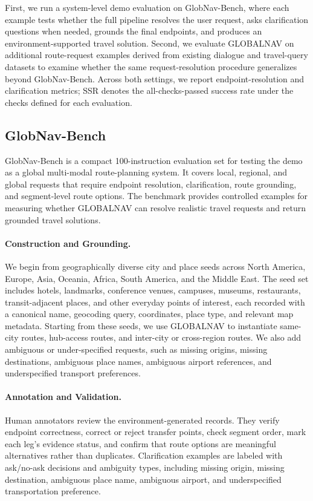 \documentclass[11pt]{article}
\newcommand{\sys}{GLOBALNAV\xspace}
\newcommand{\bench}{GlobNav-Bench\xspace}
\begin{document}
First, we run a system-level demo evaluation on \bench, where each example tests whether the full pipeline resolves the user request, asks clarification questions when needed, grounds the final endpoints, and produces an environment-supported travel solution. Second, we evaluate \sys on additional route-request examples derived from existing dialogue and travel-query datasets to examine whether the same request-resolution procedure generalizes beyond \bench. Across both settings, we report endpoint-resolution and clarification metrics; SSR denotes the all-checks-passed success rate under the checks defined for each evaluation.

\subsection{GlobNav-Bench}

\bench is a compact 100-instruction evaluation set for testing the demo as a global multi-modal route-planning system. It covers local, regional, and global requests that require endpoint resolution, clarification, route grounding, and segment-level route options. The benchmark provides controlled examples for measuring whether \sys can resolve realistic travel requests and return grounded travel solutions.

\paragraph{Construction and Grounding.}
We begin from geographically diverse city and place seeds across North America, Europe, Asia, Oceania, Africa, South America, and the Middle East. The seed set includes hotels, landmarks, conference venues, campuses, museums, restaurants, transit-adjacent places, and other everyday points of interest, each recorded with a canonical name, geocoding query, coordinates, place type, and relevant map metadata. Starting from these seeds, we use \sys to instantiate same-city routes, hub-access routes, and inter-city or cross-region routes. We also add ambiguous or under-specified requests, such as missing origins, missing destinations, ambiguous place names, ambiguous airport references, and underspecified transport preferences.

\paragraph{Annotation and Validation.}
Human annotators review the environment-generated records. They verify endpoint correctness, correct or reject transfer points, check segment order, mark each leg's evidence status, and confirm that route options are meaningful alternatives rather than duplicates. Clarification examples are labeled with ask/no-ask decisions and ambiguity types, including missing origin, missing destination, ambiguous place name, ambiguous airport, and underspecified transportation preference.
\end{document}
